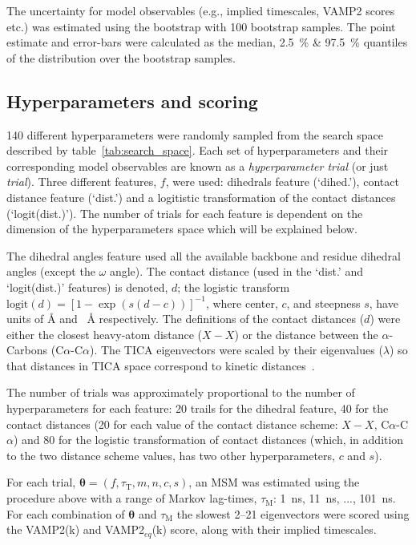 \documentclass[journal=jacsat,manuscript=article]{achemso}
\begin{document}
The uncertainty for model observables (e.g., implied timescales, VAMP2 scores etc.) was estimated using the bootstrap with \num{100} bootstrap samples. The point estimate and error-bars  were calculated as the median,   \SI{2.5}{\percent} \& \SI{97.5}{\percent} quantiles of the distribution over the bootstrap samples.

\subsection{Hyperparameters and scoring}
\num{140} different hyperparameters were randomly sampled from the search space described by table~\ref{tab:search_space}. Each set of hyperparameters and their corresponding model observables are known as a \emph{hyperparameter trial} (or just \emph{trial}). Three different features, $f$, were used: dihedrals feature (`dihed.'), contact distance feature (`dist.') and a logitistic transformation of the contact distances (`logit(dist.)').  The number of trials for each feature is dependent on the dimension of the hyperparameters space which will be explained below. 

The dihedral angles feature used all the available backbone and residue dihedral angles (except the $\omega$ angle). The contact distance (used in the `dist.' and `logit(dist.)' features) is denoted, $d$; the logistic transform $\mathrm{logit}(d) = [1-\exp{(s(d-c))}]^{-1}$, where center, $c$, and steepness $s$,  have units of \si{\angstrom} and \si{\per\angstrom} respectively. The definitions of the contact distances ($d$) were either the closest heavy-atom distance ($X-X$) or the distance between the $\alpha$-Carbons (C$\alpha$-C$\alpha$). The TICA eigenvectors were scaled by their eigenvalues ($\lambda$) so that distances in TICA space correspond to kinetic distances~\cite{noeKineticDistanceKinetic2015}.

The number of trials was approximately proportional to the number of hyperparameters for each feature: 20 trails for the dihedral feature, 40 for the contact distances (20 for each value of the contact distance scheme: $X-X$,  C$\alpha$-C$\alpha$) and 80 for the logistic transformation of contact distances (which, in addition to the two distance scheme values, has two other hyperparameters, $c$ and $s$). 

For each trial,  $\bm{\theta} = (f, \tau_{\mathrm{T}}, m, n, c, s)$,  an MSM was estimated using the procedure above with a range of Markov lag-times, $\tau_{\mathrm{M}}$: \SI{1}{\nano\second}, \SI{11}{\nano\second}, ..., \SI{101}{\nano\second}. For each combination of $\bm{\theta}$ and  $\tau_{\mathrm{M}}$ the slowest \numrange{2}{21} eigenvectors were scored using the VAMP2(k) and  VAMP2$_{eq}$(k) score, along with their implied timescales.
\end{document}
